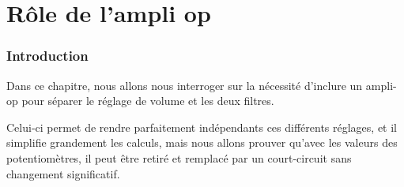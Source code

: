 \chapter{Rôle de l'ampli op}

\subsection*{Introduction}

Dans ce chapitre, nous allons nous interroger sur la nécessité
d'inclure un ampli-op pour séparer le réglage de volume
et les deux filtres.

Celui-ci permet de rendre parfaitement indépendants ces différents
réglages, et il simplifie grandement les calculs,
mais nous allons prouver qu'avec les valeurs des potentiomètres,
il peut être retiré et remplacé par un court-circuit
sans changement significatif.
